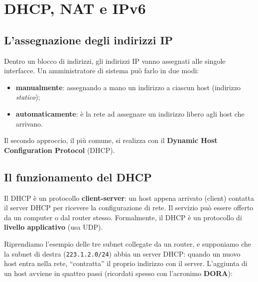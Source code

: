 \chapter{DHCP, NAT e IPv6}

\section{L'assegnazione degli indirizzi IP}

Dentro un blocco di indirizzi, gli indirizzi IP vanno assegnati alle singole interfacce. Un amministratore di sistema
può farlo in due modi:

\begin{itemize}
    \item \textbf{manualmente}: assegnando a mano un indirizzo a ciascun host (indirizzo \emph{statico});
    \item \textbf{automaticamente}: è la rete ad assegnare un indirizzo libero agli host che arrivano.
\end{itemize}

Il secondo approccio, il più comune, si realizza con il \textbf{Dynamic Host Configuration Protocol} (DHCP).


\section{Il funzionamento del DHCP}

Il DHCP è un protocollo \textbf{client-server}: un host appena arrivato (client) contatta il server DHCP per ricevere
la configurazione di rete. Il servizio può essere offerto da un computer o dal router stesso. Formalmente, il DHCP è un
protocollo di \textbf{livello applicativo} (usa UDP).

Riprendiamo l'esempio delle tre subnet collegate da un router, e supponiamo che la subnet di destra
(\texttt{223.1.2.0/24}) abbia un server DHCP: quando un nuovo host entra nella rete, ``contratta'' il proprio indirizzo
con il server. L'aggiunta di un host avviene in quattro passi (ricordati spesso con l'acronimo \textbf{DORA}):

